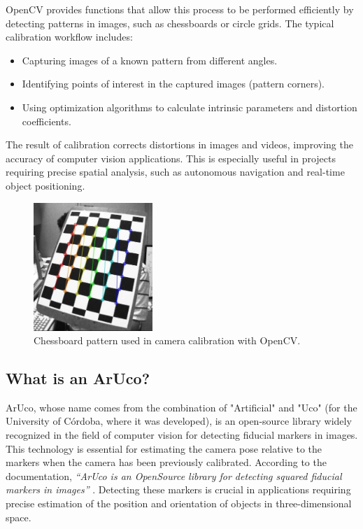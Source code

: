    OpenCV provides functions that allow this process to be performed efficiently by detecting patterns in images, such as chessboards or circle grids. The typical calibration workflow includes:  
    
    \begin{itemize}
        \item Capturing images of a known pattern from different angles.  
        \item Identifying points of interest in the captured images (pattern corners).  
        \item Using optimization algorithms to calculate intrinsic parameters and distortion coefficients.  
    \end{itemize}  
    
    The result of calibration corrects distortions in images and videos, improving the accuracy of computer vision applications. This is especially useful in projects requiring precise spatial analysis, such as autonomous navigation and real-time object positioning.  
    
    \begin{figure}[h!] 
        \centering 
        \includegraphics[width=0.4\textwidth]{pictures/calib_pattern.jpg} %
        \caption{Chessboard pattern used in camera calibration with OpenCV.} 
        \label{fig:calib_pattern} 
    \end{figure}  


\subsection{What is an ArUco?}
    ArUco, whose name comes from the combination of "Artificial" and "Uco" (for the University of Córdoba, where it was developed), is an open-source library widely recognized in the field of computer vision for detecting fiducial markers in images. This technology is essential for estimating the camera pose relative to the markers when the camera has been previously calibrated. According to the documentation, \textit{“ArUco is an OpenSource library for detecting squared fiducial markers in images”} \cite{aruco_docs}. Detecting these markers is crucial in applications requiring precise estimation of the position and orientation of objects in three-dimensional space.

